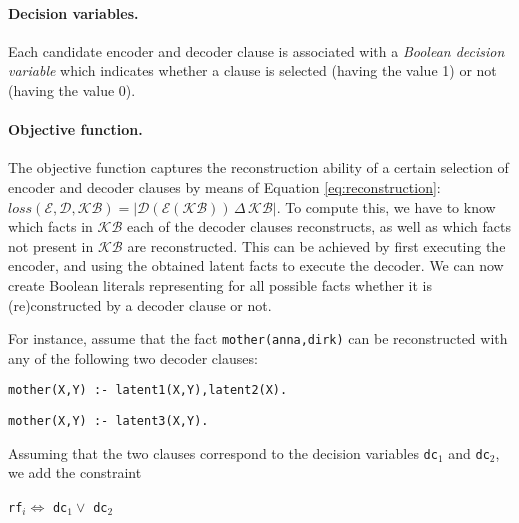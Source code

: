 \paragraph{Decision variables.}
Each candidate encoder and decoder clause is associated with a \textit{Boolean decision variable} which indicates whether a clause is selected (having the value 1) or not (having the value 0).


\paragraph{Objective function.}
The objective function captures the reconstruction ability of a certain selection of encoder and decoder clauses by means of Equation \ref{eq:reconstruction}: $loss(\mathcal{E},\mathcal{D},\mathcal{KB}) = | \mathcal{D}(\mathcal{E}(\mathcal{KB})) \, \Delta \, \mathcal{KB} |$.
To compute this, we have to know which facts in $\mathcal{KB}$ each of the decoder clauses reconstructs, as well as which facts not present in $\mathcal{KB}$ are reconstructed.
This can be achieved by first executing the encoder, and using the obtained latent facts to execute the decoder.
We can now create Boolean literals representing for all possible facts whether it is (re)constructed by a decoder clause or not.

For instance, assume that the fact \texttt{mother(anna,dirk)} can be reconstructed with any of the following two decoder clauses:
\begin{center}
	\texttt{mother(X,Y) :- latent1(X,Y),latent2(X).}

	 \texttt{mother(X,Y) :- latent3(X,Y).}
\end{center}

Assuming that the two clauses correspond to the decision variables \texttt{dc}$_1$ and \texttt{dc}$_2$, we add the constraint %

\begin{center}
\texttt{rf}$_i \Leftrightarrow$  \texttt{dc}$_1  \vee $ \texttt{dc}$_2$
\end{center}

